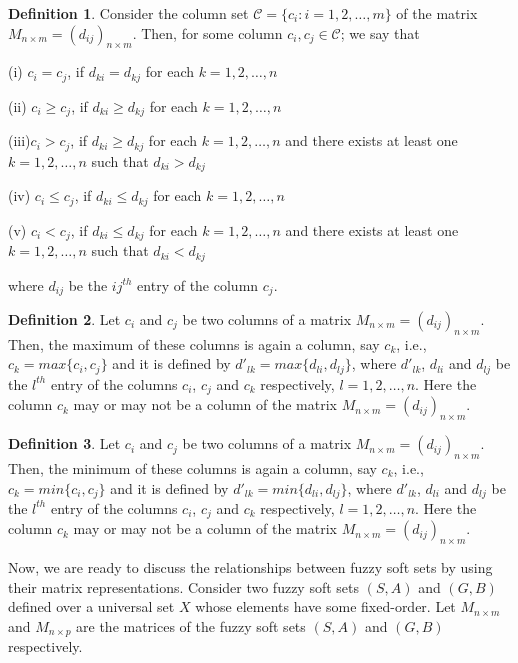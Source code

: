 \documentclass{article}
\theoremstyle{definition}
\newtheorem{definition}{Definition}[section]
\begin{document}
\begin{definition}
    Consider the column set $\mathcal{C}=\{c_i : i=1, 2, \dots, m\}$ of the matrix $M_{n\times m}=(d_{ij})_{n\times m}$. Then, for some column $c_i ,c_j \in \mathcal{C}$; we say that 

    
        (i) $c_i = c_j$, if $d_{ki} = d_{kj}$ for each $k=1, 2, \dots, n$

        
        (ii) $c_i \geq c_j$, if $d_{ki} \geq d_{kj}$ for each $k=1, 2, \dots, n$ 
        
        (iii)$c_i > c_j$, if $d_{ki} \geq d_{kj}$ for each $k=1, 2, \dots, n$ and there exists at least one $k=1, 2, \dots, n$ such that $d_{ki} > d_{kj}$
        
        (iv) $c_i \leq c_j$, if $d_{ki} \leq d_{kj}$ for each $k=1, 2, \dots, n$ 
        
        (v) $c_i < c_j$, if $d_{ki} \leq d_{kj}$ for each $k=1, 2, \dots, n$ and there exists at least one $k=1, 2, \dots, n$ such that $d_{ki} < d_{kj}$
    
    where $d_{ij}$ be the $ij^{th}$ entry of the column $c_j$.
\end{definition}

\begin{definition}
Let $c_i$ and $c_j$ be two columns of a matrix $M_{n\times m}=(d_{ij})_{n\times m}$. Then, the maximum of these columns is again a column, say $c_k$, i.e., $c_k=max\{c_i, c_j\}$ and it is defined by $d'_{lk}= max\{d_{li}, d_{lj}\}$, where $d'_{lk}$, $d_{li}$ and $d_{lj}$ be the $l^{th}$ entry of the columns $c_i$, $c_j$ and $c_k$ respectively, $l=1,2,\dots, n$. Here the column $c_k$ may or may not be a column of the matrix $M_{n\times m}=(d_{ij})_{n\times m}$.
\end{definition}

\begin{definition}
Let $c_i$ and $c_j$ be two columns of a matrix $M_{n\times m}=(d_{ij})_{n\times m}$. Then, the minimum of these columns is again a column, say $c_k$, i.e., $c_k=min\{c_i, c_j\}$ and it is defined by $d'_{lk}= min\{d_{li}, d_{lj}\}$, where $d'_{lk}$, $d_{li}$ and $d_{lj}$ be the $l^{th}$ entry of the columns $c_i$, $c_j$ and $c_k$ respectively, $l=1,2,\dots, n$. Here the column $c_k$ may or may not be a column of the matrix $M_{n\times m}=(d_{ij})_{n\times m}$.
\end{definition}


Now, we are ready to discuss the relationships between fuzzy soft sets by using their matrix representations. Consider two fuzzy soft sets $(S,A)$ and $(G,B)$ defined over a universal set $X$ whose elements have some fixed-order. Let $M_{n\times m}$ and $M_{n\times p}$ are the matrices of the fuzzy soft sets $(S,A)$ and $(G,B)$ respectively.\\
\end{document}
